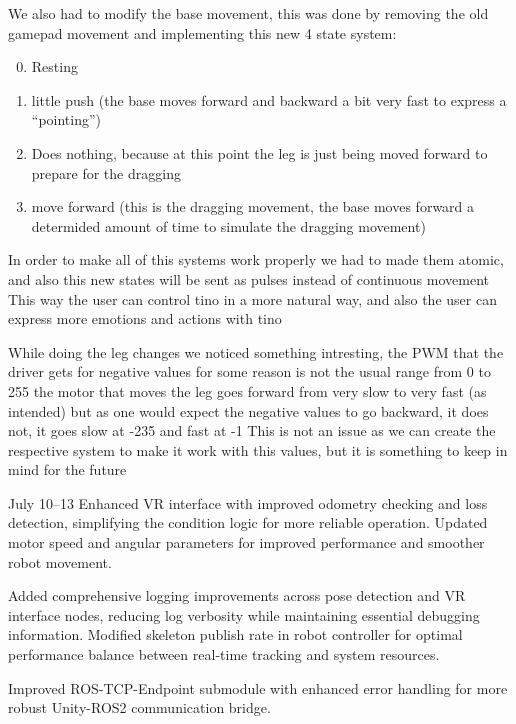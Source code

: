 We also had to modify the base movement, this was done by removing the old gamepad movement and implementing this new 4 state system:

\begin{enumerate}
\setcounter{enumi}{-1}
\item Resting
\item little push (the base moves forward and backward a bit very fast to express a ``pointing'')
\item Does nothing, because at this point the leg is just being moved forward to prepare for the dragging
\item move forward (this is the dragging movement, the base moves forward a determided amount of time to simulate the dragging movement)
\end{enumerate}

In order to make all of this systems work properly we had to made them atomic, and also this new states will be sent as pulses instead of continuous movement
This way the user can control tino in a more natural way, and also the user can express more emotions and actions with tino

While doing the leg changes we noticed something intresting, the PWM that the driver gets for negative values for some reason is not the usual range
from  0 to  255 the motor that moves the leg goes forward from very slow to very fast (as intended) but as one would expect the negative values to go backward, it does not, it goes slow at -235 and fast at -1 
This is not an issue as we can create the respective system to make it work with this values, but it is something to keep in mind for the future

July 10--13
Enhanced VR interface with improved odometry checking and loss detection, simplifying the condition logic for more reliable operation. Updated motor speed and angular parameters for improved performance and smoother robot movement.

Added comprehensive logging improvements across pose detection and VR interface nodes, reducing log verbosity while maintaining essential debugging information. Modified skeleton publish rate in robot controller for optimal performance balance between real-time tracking and system resources.

Improved ROS-TCP-Endpoint submodule with enhanced error handling for more robust Unity-ROS2 communication bridge.

